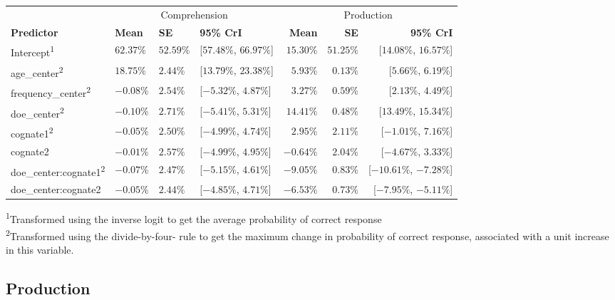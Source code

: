 \documentclass[
  english,
  man,man,floatsintext]{apa6}
\begin{document}
\captionsetup[table]{labelformat=empty,skip=1pt}
\begin{longtable}{llllrrr}
\toprule
& \multicolumn{3}{c}{Comprehension} & \multicolumn{3}{c}{Production} \\ 
 \cmidrule(lr){2-4}\cmidrule(lr){5-7}
\textbf{Predictor} & \textbf{Mean} & \textbf{SE} & \textbf{95\% CrI} & \textbf{Mean} & \textbf{SE} & \textbf{95\% CrI} \\ 
\midrule
Intercept\textsuperscript{1} & $62.37\%$ & $52.59\%$ & [$57.48\%$, $66.97\%$] & $15.30\%$ & $51.25\%$ & [$14.08\%$, $16.57\%$] \\ 
age\_center\textsuperscript{2} & $18.75\%$ & $2.44\%$ & [$13.79\%$, $23.38\%$] & $5.93\%$ & $0.13\%$ & [$5.66\%$, $6.19\%$] \\ 
frequency\_center\textsuperscript{2} & $-0.08\%$ & $2.54\%$ & [$-5.32\%$, $4.87\%$] & $3.27\%$ & $0.59\%$ & [$2.13\%$, $4.49\%$] \\ 
doe\_center\textsuperscript{2} & $-0.10\%$ & $2.71\%$ & [$-5.41\%$, $5.31\%$] & $14.41\%$ & $0.48\%$ & [$13.49\%$, $15.34\%$] \\ 
cognate1\textsuperscript{2} & $-0.05\%$ & $2.50\%$ & [$-4.99\%$, $4.74\%$] & $2.95\%$ & $2.11\%$ & [$-1.01\%$, $7.16\%$] \\ 
cognate2 & $-0.01\%$ & $2.57\%$ & [$-4.99\%$, $4.95\%$] & $-0.64\%$ & $2.04\%$ & [$-4.67\%$, $3.33\%$] \\ 
doe\_center:cognate1\textsuperscript{2} & $-0.07\%$ & $2.47\%$ & [$-5.15\%$, $4.61\%$] & $-9.05\%$ & $0.83\%$ & [$-10.61\%$, $-7.28\%$] \\ 
doe\_center:cognate2 & $-0.05\%$ & $2.44\%$ & [$-4.85\%$, $4.71\%$] & $-6.53\%$ & $0.73\%$ & [$-7.95\%$, $-5.11\%$] \\ 
\bottomrule
\end{longtable}
\vspace{-5mm}
\begin{minipage}{\linewidth}
\textsuperscript{1}Transformed using the inverse logit to get the average probability of correct response \\ 
\textsuperscript{2}Transformed using the divide-by-four- rule to get the maximum change in probability of correct response, associated with a unit increase in this variable. \\ 
\end{minipage}

\hypertarget{production}{%
\subsection{Production}\label{production}}
\end{document}
